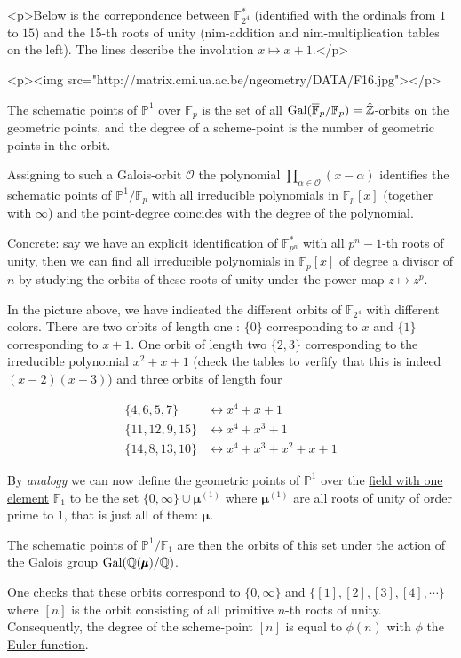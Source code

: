 <p>Below is the correpondence between $\mathbb{F}_{2^4}^{\ast}$ (identified with the ordinals from $1$ to $15$) and the 15-th roots of unity (nim-addition and nim-multiplication tables on the left). The lines describe the involution $x \mapsto x+1$.</p>

<p><img src="http://matrix.cmi.ua.ac.be/ngeometry/DATA/F16.jpg"></p>

The schematic points of $\mathbb{P}^1$ over $\mathbb{F}_p$ is the set of all $\operatorname{Gal}(\overline{\mathbb{F}}_p/\mathbb{F}_p) = \hat{\mathbb{Z}}$-orbits on the geometric points, and the degree of a scheme-point is the number of geometric points in the orbit.

Assigning to such a Galois-orbit $\mathcal{O}$ the polynomial $\prod_{\alpha \in \mathcal{O}} (x-\alpha)$ identifies the schematic points of $\mathbb{P}^1/\mathbb{F}_p$ with all irreducible polynomials in $\mathbb{F}_p[x]$ (together with $\infty$) and the point-degree coincides with the degree of the polynomial.

Concrete: say we have an explicit identification of $\mathbb{F}_{p^n}^{\ast}$ with all $p^n-1$-th roots of unity, then we can find all irreducible polynomials in $\mathbb{F}_p[x]$ of degree a divisor of $n$ by studying the orbits of these roots of unity under the power-map $z \mapsto z^p$.

In the picture above, we have indicated the different orbits of $\mathbb{F}_{2^4}$ with different colors. There are two orbits of length one : $\{ 0 \}$ corresponding to $x$ and $\{ 1 \}$ corresponding to $x+1$. One orbit of length two $\{ 2,3 \}$ corresponding to the irreducible polynomial $x^2+x+1$ (check the tables to verfify that this is indeed $(x-2)(x-3)$) and three orbits of length four

\begin{equation}
  \begin{aligned}
    \{ 4,6,5,7 \} &\leftrightarrow x^4+x+1 \\
    \{ 11,12,9,15 \} &\leftrightarrow x^4+x^3+1 \\
    \{ 14,8,13,10 \} &\leftrightarrow x^4+x^3+x^2+x+1
  \end{aligned}
\end{equation}

By \emph{analogy} we can now define the geometric points of $\mathbb{P}^1$ over the \href{http://en.wikipedia.org/wiki/Field_with_one_element}{field with one element} $\mathbb{F}_1$ to be the set $\{ 0,\infty \} \cup \pmb{\mu}^{(1)}$ where $\pmb{\mu}^{(1)}$ are all roots of unity of order prime to $1$, that is just all of them: $\pmb{\mu}$.

The schematic points of $\mathbb{P}^1/\mathbb{F}_1$ are then the orbits of this set under the action of the Galois group $\operatorname{Gal}(\mathbb{Q}(\pmb{\mu})/\mathbb{Q})$.

One checks that these orbits correspond to $\{ 0,\infty \}$ and $\{ [1],[2],[3],[4],\cdots \}$ where $[n]$ is the orbit consisting of all primitive $n$-th roots of unity. Consequently, the degree of the scheme-point $[n]$ is equal to $\phi(n)$ with $\phi$ the \href{http://en.wikipedia.org/wiki/Euler's_totient_function}{Euler function}.
